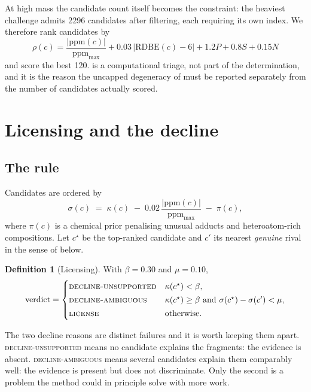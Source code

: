 \documentclass[11pt,twocolumn,a4paper]{article}
\theoremstyle{definition}
\newtheorem{definition}[theorem]{Definition}
\theoremstyle{remark}
\newcommand{\con}{\kappa}
\newcommand{\ppm}{\mathrm{ppm}}
\newcommand{\licenseword}{\textsc{license}}
\begin{document}
At high mass the candidate count itself becomes the constraint: the heaviest
challenge admits 2296 candidates after filtering, each requiring its own index. We
therefore rank candidates by
\begin{equation}
\rho(c) = \frac{|\ppm(c)|}{\ppm_{\max}} + 0.03\,|\mathrm{RDBE}(c) - 6| + 1.2 P + 0.8 S + 0.15 N
\label{eq:prefilter}
\end{equation}
and score the best 120.  is a computational triage, not part
of the determination, and it is the reason the uncapped degeneracy of
 must be reported separately from the number of candidates
actually scored.

\section{Licensing and the decline}
\label{sec:licensing}

\subsection{The rule}

Candidates are ordered by
\begin{equation}
\sigma(c) \;=\; \con(c) \;-\; 0.02\,\frac{|\ppm(c)|}{\ppm_{\max}} \;-\; \pi(c),
\label{eq:score}
\end{equation}
where $\pi(c)$ is a chemical prior penalising unusual adducts and heteroatom-rich
compositions. Let $c^\star$ be the top-ranked candidate and $c'$ its nearest
\emph{genuine} rival in the sense of  below.

\begin{definition}[Licensing]
\label{def:license}
With $\beta = 0.30$ and $\mu = 0.10$,
\[
\text{verdict} =
\begin{cases}
\text{\textsc{decline-unsupported}} & \con(c^\star) < \beta,\\[2pt]
\text{\textsc{decline-ambiguous}}   & \con(c^\star) \ge \beta \text{ and } \sigma(c^\star) - \sigma(c') < \mu,\\[2pt]
\text{\licenseword}                 & \text{otherwise.}
\end{cases}
\]
\end{definition}

The two decline reasons are distinct failures and it is worth keeping them apart.
\textsc{decline-unsupported} means no candidate explains the fragments: the
evidence is absent. \textsc{decline-ambiguous} means several candidates explain
them comparably well: the evidence is present but does not discriminate. Only the
second is a problem the method could in principle solve with more work.
\end{document}
